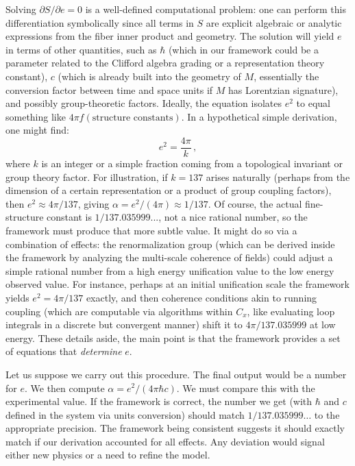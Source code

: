\documentclass[11pt]{article}
\begin{document}
Solving $\partial S/\partial e = 0$ is a well-defined computational problem: one can perform this differentiation symbolically since all terms in $S$ are explicit algebraic or analytic expressions from the fiber inner product and geometry. The solution will yield $e$ in terms of other quantities, such as $\hbar$ (which in our framework could be a parameter related to the Clifford algebra grading or a representation theory constant), $c$ (which is already built into the geometry of $M$, essentially the conversion factor between time and space units if $M$ has Lorentzian signature), and possibly group-theoretic factors. Ideally, the equation isolates $e^2$ to equal something like $4\pi f(\text{structure constants})$. In a hypothetical simple derivation, one might find:
\[ e^2 = \frac{4\pi}{k}\, ,\] 
where $k$ is an integer or a simple fraction coming from a topological invariant or group theory factor. For illustration, if $k=137$ arises naturally (perhaps from the dimension of a certain representation or a product of group coupling factors), then $e^2 \approx 4\pi/137$, giving $\alpha = e^2/(4\pi) \approx 1/137$. Of course, the actual fine-structure constant is $1/137.035999...$, not a nice rational number, so the framework must produce that more subtle value. It might do so via a combination of effects: the renormalization group (which can be derived inside the framework by analyzing the multi-scale coherence of fields) could adjust a simple rational number from a high energy unification value to the low energy observed value. For instance, perhaps at an initial unification scale the framework yields $e^2 = 4\pi/137$ exactly, and then coherence conditions akin to running coupling (which are computable via algorithms within $C_x$, like evaluating loop integrals in a discrete but convergent manner) shift it to $4\pi/137.035999$ at low energy. These details aside, the main point is that the framework provides a set of equations that \emph{determine} $e$.

Let us suppose we carry out this procedure. The final output would be a number for $e$. We then compute $\alpha = e^2/(4\pi\hbar c)$. We must compare this with the experimental value. If the framework is correct, the number we get (with $\hbar$ and $c$ defined in the system via units conversion) should match $1/137.035999\dots$ to the appropriate precision. The framework being consistent suggests it should exactly match if our derivation accounted for all effects. Any deviation would signal either new physics or a need to refine the model.
\end{document}

